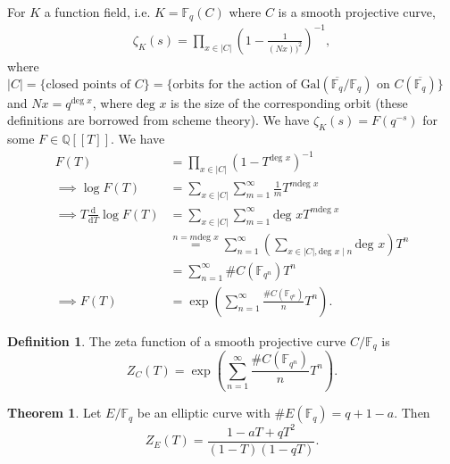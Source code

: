 \documentclass{article}
\theoremstyle{definition}
\newtheorem{theorem}{Theorem}[section]
\newtheorem{defn}{Definition}[section]
\begin{document}
For $K$ a function field, i.e. $K = \mathbb{F}_q(C)$ where $C$ is a smooth projective curve,
\begin{align*}
    \zeta_K(s) = \prod_{x \in \left|C\right|} \left(1-\frac{1}{(Nx))^2}\right)^{-1}, 
\end{align*}
where $\left|C\right| = \{\text{closed points of }C\} = \{\text{orbits for the action of Gal}(\overline{\mathbb{F}_q}/\mathbb{F}_q) \text{ on }C(\overline{\mathbb{F}_q})\}$ and $Nx = q^{\text{deg }x}$, where $\text{deg }x$ is the size of the corresponding orbit (these definitions are borrowed from scheme theory). We have $\zeta_K(s) = F(q^{-s})$ for some $F \in \mathbb{Q}[[T]]$. We have
\begin{align*}
    F(T) &= \prod_{x \in \left|C\right|}^{} \left(1-T^{\text{deg }x}\right)^{-1} \\
    \implies \log F(T) &= \sum_{x \in \left|C\right|}^{} \sum_{m=1}^{\infty} \frac{1}{m}T^{m \text{deg }x} \\
    \implies T\frac{\mathrm{d}}{\mathrm{d}T} \log F(T) &= \sum_{x \in \left|C\right|}^{} \sum_{m=1}^{\infty} \text{deg }x T^{m \text{deg }x} \\
    &\stackrel{n = m\text{deg }x}{=} \sum_{n=1}^{\infty} \left(\sum_{x \in \left|C\right|,\text{deg }x \mid n}^{} \text{deg }x \right)T^n \\
    &= \sum_{n=1}^{\infty} \# C(\mathbb{F}_{q^n})T^n \\
    \implies F(T) &= \exp \left(\sum_{n=1}^{\infty} \frac{\# C(\mathbb{F}_{q^n})}{n}T^n \right).
\end{align*}
\begin{defn}
    The zeta function of a smooth projective curve $C/\mathbb{F}_q$ is 
    \[
    Z_C(T) = \exp \left(\sum_{n=1}^{\infty} \frac{\# C(\mathbb{F}_{q^n})}{n}T^n \right).
    \]
\end{defn}
\begin{theorem}\label{theorem7.4}
    Let $E/\mathbb{F}_q$ be an elliptic curve with $\#E(\mathbb{F}_q) = q+1 - a$. Then \[
    Z_E(T) = \frac{1-aT+qT^2}{(1-T)(1-qT)}.
    \]
\end{theorem}
\end{document}

